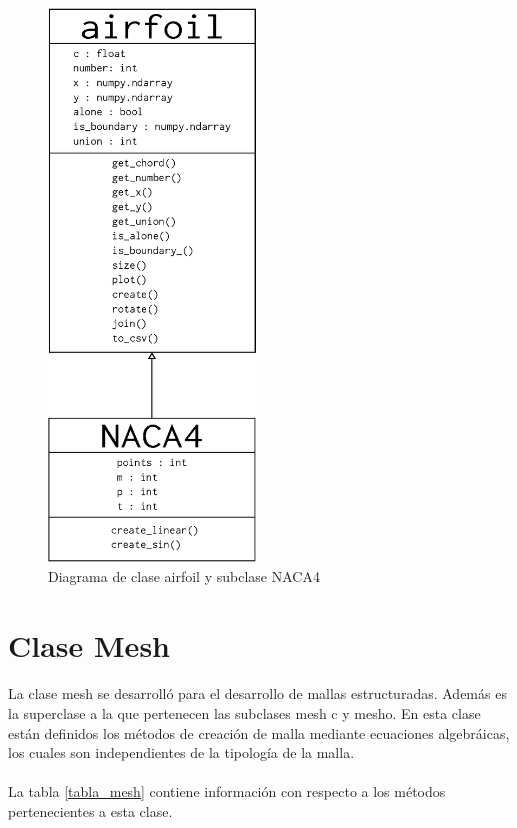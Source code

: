 \documentclass[letterpaper, openright, 12pt]{book}
\begin{document}
    \begin{figure}[htbp!]
        \centering
        \includegraphics[width=55mm]{./Imagenes/airfoil_class}
        \caption[Diagrama de clase airfoil y subclase NACA4]{Diagrama de clase airfoil y subclase
        NACA4}
        \label{airfoil_class}
    \end{figure}


    \section{Clase Mesh}
    \paragraph*{}
        La clase mesh se desarrolló para el desarrollo de mallas estructuradas.
        Además es la superclase a la que pertenecen las subclases mesh
        \textunderscore c y mesh\textunderscore o. En esta clase están definidos
        los métodos de creación de malla mediante ecuaciones algebráicas, los
        cuales son independientes de la tipología de la malla.

    \paragraph*{}
        La tabla \ref{tabla_mesh} contiene información con respecto a los
        métodos pertenecientes a esta clase.
\end{document}
